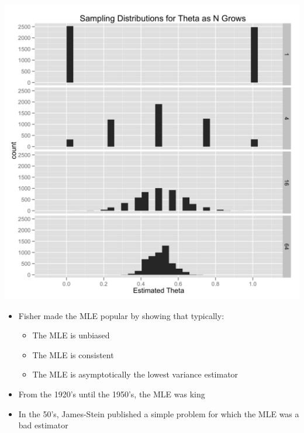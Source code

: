 \documentclass{beamer}
\begin{document}
\frame
{
  \begin{center}
    \includegraphics[scale = 0.1]{sampling_distribution.png}
  \end{center}
}

\frame
{
  \begin{itemize}
    \item{Fisher made the MLE popular by showing that typically:}
    \begin{itemize}
      \item{The MLE is unbiased}
      \item{The MLE is consistent}
      \item{The MLE is asymptotically the lowest variance estimator}
    \end{itemize}
  \end{itemize}
}

\frame
{
  \begin{itemize}
    \item{From the 1920's until the 1950's, the MLE was king}
    \item{In the 50's, James-Stein published a simple problem for which the MLE was a bad estimator}
  \end{itemize}
}

\end{document}
